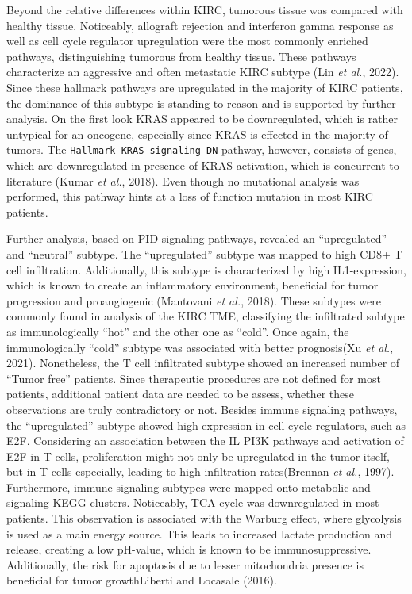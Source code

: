 \documentclass[
  parskip,
  oneside]{scrreprt}
\begin{document}
Beyond the relative differences within KIRC, tumorous tissue was
compared with healthy tissue. Noticeably, allograft rejection and
interferon gamma response as well as cell cycle regulator upregulation
were the most commonly enriched pathways, distinguishing tumorous from
healthy tissue. These pathways characterize an aggressive and often
metastatic KIRC subtype (Lin \emph{et al.}, 2022). Since these hallmark
pathways are upregulated in the majority of KIRC patients, the dominance
of this subtype is standing to reason and is supported by further
analysis. On the first look KRAS appeared to be downregulated, which is
rather untypical for an oncogene, especially since KRAS is effected in
the majority of tumors. The \texttt{Hallmark\ KRAS\ signaling\ DN}
pathway, however, consists of genes, which are downregulated in presence
of KRAS activation, which is concurrent to literature (Kumar \emph{et
al.}, 2018). Even though no mutational analysis was performed, this
pathway hints at a loss of function mutation in most KIRC patients.

Further analysis, based on PID signaling pathways, revealed an
``upregulated'' and ``neutral'' subtype. The ``upregulated'' subtype was
mapped to high CD8+ T cell infiltration. Additionally, this subtype is
characterized by high IL1-expression, which is known to create an
inflammatory environment, beneficial for tumor progression and
proangiogenic (Mantovani \emph{et al.}, 2018). These subtypes were
commonly found in analysis of the KIRC TME, classifying the infiltrated
subtype as immunologically ``hot'' and the other one as ``cold''. Once
again, the immunologically ``cold'' subtype was associated with better
prognosis(Xu \emph{et al.}, 2021). Nonetheless, the T cell infiltrated
subtype showed an increased number of ``Tumor free'' patients. Since
therapeutic procedures are not defined for most patients, additional
patient data are needed to be assess, whether these observations are
truly contradictory or not. Besides immune signaling pathways, the
``upregulated'' subtype showed high expression in cell cycle regulators,
such as E2F. Considering an association between the IL PI3K pathways and
activation of E2F in T cells, proliferation might not only be
upregulated in the tumor itself, but in T cells especially, leading to
high infiltration rates(Brennan \emph{et al.}, 1997). Furthermore,
immune signaling subtypes were mapped onto metabolic and signaling KEGG
clusters. Noticeably, TCA cycle was downregulated in most patients. This
observation is associated with the Warburg effect, where glycolysis is
used as a main energy source. This leads to increased lactate production
and release, creating a low pH-value, which is known to be
immunosuppressive. Additionally, the risk for apoptosis due to lesser
mitochondria presence is beneficial for tumor growthLiberti and Locasale
(2016).
\end{document}
